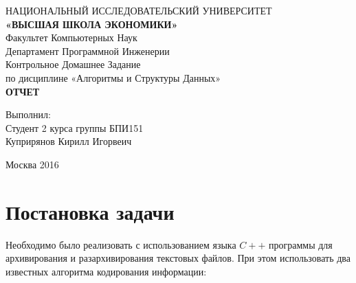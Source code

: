 \documentclass[a4paper, 12pt]{article}
\begin{document}
\begingroup
    \fontsize{14pt}{14pt}\selectfont
\begin{center}
\hfill \break
\footnotesize{НАЦИОНАЛЬНЫЙ ИССЛЕДОВАТЕЛЬСКИЙ УНИВЕРСИТЕТ}\\
\small{\textbf{«ВЫСШАЯ ШКОЛА ЭКОНОМИКИ»}}\\
\hfill \break
\normalsize{Факультет Компьютерных Наук}\\
 \hfill \break
\normalsize{Департамент Программной Инженерии}\\
\hfill\break
\hfill \break
\hfill \break
\hfill \break
\hfill \break
\hfill \break
\hfill \break
\hfill \break
\normalsize{Контрольное Домашнее Задание\\
\hfill \break
по дисциплине «Алгоритмы и Структуры Данных»\\
\hfill \break
\textbf{ОТЧЕТ}}\\
\hfill \break
\hfill \break
\end{center}

\hfill \break
\hfill \break
\hfill \break
\hfill \break
\begin{flushright}
  \normalsize{Выполнил:}\\
  \normalsize{Студент 2 курса группы БПИ151}\\
  \normalsize{Куприрянов Кирилл Игорвеич}
\end{flushright}
\hfill \break
\hfill \break
\hfill \break
\hfill \break
\hfill \break
\hfill \break
\hfill \break
\begin{center} Москва 2016 \end{center}
\thispagestyle{empty} %

\endgroup

\newpage
    \tableofcontents %
\newpage

\newpage
\section{Постановка задачи}
Необходимо было реализовать с использованием языка $C++$ программы для архивирования и
разархивирования текстовых файлов. При этом использовать два известных алгоритма кодирования информации:
\end{document}
